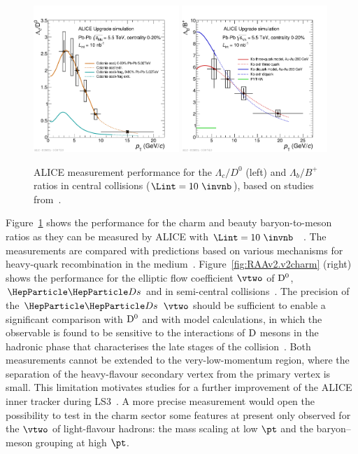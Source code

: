 \begin{figure}[!t]
\centering
\includegraphics[width=0.49\textwidth]{hf/figures/ALICE_LcOverD_YR.pdf}
\includegraphics[width=0.49\textwidth]{hf/figures/ALICE_LbOverB_YR.pdf}
\caption{ALICE measurement performance for the $\Lambda_c/D^0$ (left) and $\Lambda_b/B^+$ ratios in central \PbPb collisions ($\Lint=10~\invnb$), based on studies from~\cite{Abelev:1625842}.}
\label{fig:HFLcLb}
\end {figure}

Figure~\ref{fig:HFLcLb} shows the performance for the charm and beauty baryon-to-meson ratios as they can be measured by ALICE with $\Lint=10~\invnb$ ~\cite{Abelev:1625842}. The measurements are compared with predictions based on various mechanisms for heavy-quark recombination in the medium~\cite{Plumari:2017ntm,Oh:2009zj}.
Figure~\ref{fig:RAAv2.v2charm} (right) shows the performance for the elliptic flow coefficient $\vtwo$ of $\rm D^0$, $\PDs$ and \PGLc 
in semi-central \PbPb collisions~\cite{Abelev:1625842}. The precision of the $\PDs$ $\vtwo$ should be sufficient to enable a significant comparison with $\rm D^0$ and with model calculations, in which the 
observable is found to be sensitive to the interactions of $\rm D$ mesons in the hadronic phase that characterises the late stages of the collision~\cite{He:2014cla}. 
Both measurements cannot be extended to the very-low-momentum region, where the separation of the heavy-flavour secondary vertex from the primary vertex is small.  
This limitation motivates studies for a further improvement of the ALICE inner tracker during LS3~\cite{ALICE:ITS3LoI}.  A more precise measurement would open the possibility to test in the charm sector some features at present only observed for the $\vtwo$ of light-flavour hadrons: the mass scaling at low $\pt$ and 
the baryon--meson grouping at high $\pt$.



